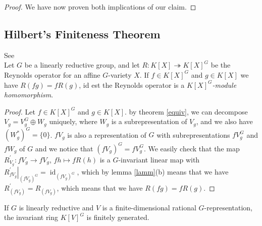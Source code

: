 \begin{proof}
  We have now proven both implications of our claim.
\end{proof}

\subsection{Hilbert's Finiteness Theorem}

\begin{proposition}
  See \cite[p.41 Corollary 2.2.7]{DK15}\\
  Let $G$ be a linearly reductive group, and let $ R \colon K[X] \twoheadrightarrow K[X]^G $ be the Reynolds operator for an affine $G$-variety $X$.
  If $f \in K[X]^G$ and $g \in K[X]$ we have $R(fg) = fR(g)$, id est the Reynolds operator is a \textit{$K[X]^G$-module homomorphism}.
\end{proposition}

\begin{proof}
  Let $f \in K[X]^G$ and $g \in K[X]$.
  by theorem \ref{equiv}, we can decompose $V_g = V_g^G \oplus W_g$ uniquely, where $W_g$ is a subrepresentation of $V_g$, and we also have $(W_g^\ast)^G = \{0\}$.
  $fV_g$ is also a representation of $G$ with subrepresentations $fV_g^G$ and $fW_g$ of $G$ and we notice that $(fV_g)^G = fV_g^G$.
  We easily check that the map $R_{V_g}^\prime \colon fV_g \longrightarrow fV_g$, $fh \mapsto f R(h)$ is a $G$-invariant linear map with $\left. R_{fV_g}^\prime \right|_{(fV_g)^G} = \operatorname{id}_{(fV_g)^G}$, which by lemma \ref{lamm}(b) means that we have $R_{(fV_g)}^\prime = R_{(fV_g)}$, which means that we have $R(fg) = fR(g)$.
\end{proof}


\begin{theorem}\label{hilbert}
  If $G$ is linearly reductive and $V$ is a finite-dimensional rational $G$-representation, the invariant ring $K[V]^G$ is finitely generated.
\end{theorem}


